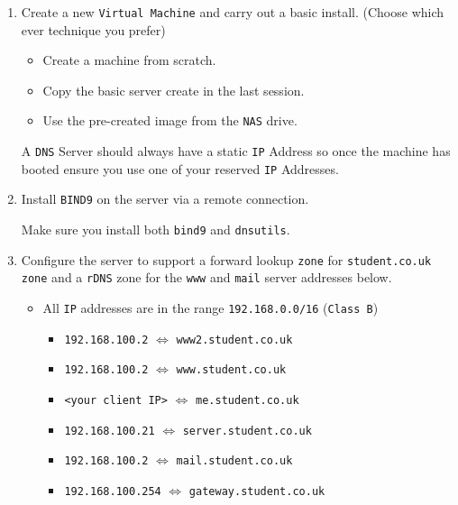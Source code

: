 \documentclass[11pt]{article}
\begin{document}
\begin{enumerate}
    \item Create a new \texttt{Virtual Machine} and carry out a basic install. (Choose which ever technique you prefer)
        \begin{itemize}
            \item Create a machine from scratch.
            \item Copy the basic server create in the last session.
            \item Use the pre-created image from the \texttt{NAS} drive.
        \end{itemize}
        \begin{tcolorbox}[title={\textbf{NOTE:}}]
            A \texttt{DNS} Server should always have a static \texttt{IP} Address so once the machine has booted ensure you use one of your reserved \texttt{IP} Addresses.
        \end{tcolorbox}
    \item Install \texttt{BIND9} on the server via a remote connection. 
        \begin{tcolorbox}[title={\textbf{NOTE:}}]
            Make sure you install both \texttt{bind9} and \texttt{dnsutils}. 
        \end{tcolorbox}
    \item Configure the server to support a forward lookup \texttt{zone} for \texttt{student.co.uk zone} and a \texttt{rDNS} zone for the \texttt{www} and \texttt{mail} server addresses below. 
        \begin{itemize}
            \item All \texttt{IP} addresses are in the range \texttt{192.168.0.0/16} (\texttt{Class B})
            \begin{itemize}
                \item \texttt{192.168.100.2} $\Leftrightarrow$ \texttt{www2.student.co.uk}
                \item \texttt{192.168.100.2} $\Leftrightarrow$ \texttt{www.student.co.uk}
                \item \texttt{<your client IP>} $\Leftrightarrow$ \texttt{me.student.co.uk}
                \item \texttt{192.168.100.21} $\Leftrightarrow$ \texttt{server.student.co.uk}
                \item \texttt{192.168.100.2} $\Leftrightarrow$ \texttt{mail.student.co.uk}
                \item \texttt{192.168.100.254} $\Leftrightarrow$ \texttt{gateway.student.co.uk}

\end{itemize}
\end{itemize}
\end{enumerate}
\end{document}
